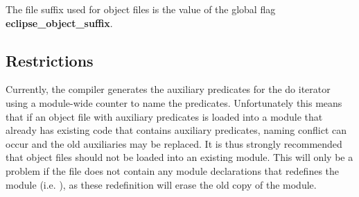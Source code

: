 The file suffix used for {\eclipse} object files is the value of the
global flag {\bf eclipse_object_suffix}.


\subsection{Restrictions}

Currently, the compiler generates the auxiliary predicates for the do
iterator using a module-wide counter to name the predicates. Unfortunately this
means that if an object file with auxiliary predicates is loaded into a
module that already has existing code that contains auxiliary predicates, 
naming conflict can occur and the old auxiliaries may be replaced. It is
thus strongly recommended that object files should not be loaded into an
existing module. This will only be a problem if the file does not contain
any module declarations that redefines the module (i.e. ),
as these redefinition will erase the old copy of
the module.


%
%

